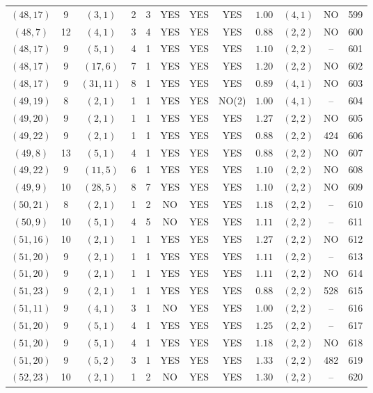 \begin{longtable}{|c|c|c|c|c|c|c|c|c|c|c|c|}
$(48,17)$ & 9 & $(3,1)$ & 2 & 3 & YES & YES & YES & $1.00$ & $(4,1)$ & NO & 599\\
$(48,7)$ & 12 & $(4,1)$ & 3 & 4 & YES & YES & YES & $0.88$ & $(2,2)$ & NO & 600\\
$(48,17)$ & 9 & $(5,1)$ & 4 & 1 & YES & YES & YES & $1.10$ & $(2,2)$ & -- & 601\\
$(48,17)$ & 9 & $(17,6)$ & 7 & 1 & YES & YES & YES & $1.20$ & $(2,2)$ & NO & 602\\
$(48,17)$ & 9 & $(31,11)$ & 8 & 1 & YES & YES & YES & $0.89$ & $(4,1)$ & NO & 603\\
$(49,19)$ & 8 & $(2,1)$ & 1 & 1 & YES & YES & NO(2) & $1.00$ & $(4,1)$ & -- & 604\\
$(49,20)$ & 9 & $(2,1)$ & 1 & 1 & YES & YES & YES & $1.27$ & $(2,2)$ & NO & 605\\
$(49,22)$ & 9 & $(2,1)$ & 1 & 1 & YES & YES & YES & $0.88$ & $(2,2)$ & 424 & 606\\
$(49,8)$ & 13 & $(5,1)$ & 4 & 1 & YES & YES & YES & $0.88$ & $(2,2)$ & NO & 607\\
$(49,22)$ & 9 & $(11,5)$ & 6 & 1 & YES & YES & YES & $1.10$ & $(2,2)$ & NO & 608\\
$(49,9)$ & 10 & $(28,5)$ & 8 & 7 & YES & YES & YES & $1.10$ & $(2,2)$ & NO & 609\\
$(50,21)$ & 8 & $(2,1)$ & 1 & 2 & NO & YES & YES & $1.18$ & $(2,2)$ & -- & 610\\
$(50,9)$ & 10 & $(5,1)$ & 4 & 5 & NO & YES & YES & $1.11$ & $(2,2)$ & -- & 611\\
$(51,16)$ & 10 & $(2,1)$ & 1 & 1 & YES & YES & YES & $1.27$ & $(2,2)$ & NO & 612\\
$(51,20)$ & 9 & $(2,1)$ & 1 & 1 & YES & YES & YES & $1.11$ & $(2,2)$ & -- & 613\\
$(51,20)$ & 9 & $(2,1)$ & 1 & 1 & YES & YES & YES & $1.11$ & $(2,2)$ & NO & 614\\
$(51,23)$ & 9 & $(2,1)$ & 1 & 1 & YES & YES & YES & $0.88$ & $(2,2)$ & 528 & 615\\
$(51,11)$ & 9 & $(4,1)$ & 3 & 1 & NO & YES & YES & $1.00$ & $(2,2)$ & -- & 616\\
$(51,20)$ & 9 & $(5,1)$ & 4 & 1 & YES & YES & YES & $1.25$ & $(2,2)$ & -- & 617\\
$(51,20)$ & 9 & $(5,1)$ & 4 & 1 & YES & YES & YES & $1.18$ & $(2,2)$ & NO & 618\\
$(51,20)$ & 9 & $(5,2)$ & 3 & 1 & YES & YES & YES & $1.33$ & $(2,2)$ & 482 & 619\\
$(52,23)$ & 10 & $(2,1)$ & 1 & 2 & NO & YES & YES & $1.30$ & $(2,2)$ & -- & 620\\

\end{longtable}
